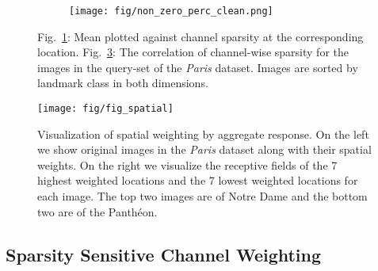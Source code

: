 \documentclass[runningheads]{llncs}
\begin{document}
\begin{figure}[t]
\begin{subfigure}{0.56\textwidth}
\caption{}
\label{fig:sparsity2}
\end{subfigure}
\begin{subfigure}{0.43\textwidth}
\centering
\vspace{-.79cm}
\texttt{[image: fig/non\_zero\_perc\_clean.png]}
\caption{}
\label{fig:sparsity_correlation}
\end{subfigure}
\caption{Fig.~\ref{fig:sparsity2}: Mean  plotted against channel sparsity at the corresponding location. Fig.~\ref{fig:sparsity_correlation}: The correlation of channel-wise sparsity for the  images in the query-set of the \emph{Paris} dataset. Images are sorted by landmark class in both dimensions.}


\end{figure}




\begin{figure*}[t]




\texttt{[image: fig/fig\_spatial]}
    \caption{\small{Visualization of spatial weighting by aggregate response. On the left we show original images in the \emph{Paris} dataset along with their spatial weights. On the right we visualize the receptive fields of the 7 highest weighted locations and the 7 lowest weighted locations for each image. The top two images are of Notre Dame and the bottom two are of the Panth\'{e}on.}}
	\label{fig:patches}
\end{figure*}









  


\subsection{Sparsity Sensitive Channel Weighting}
\label{subsec:idf}
\end{document}
